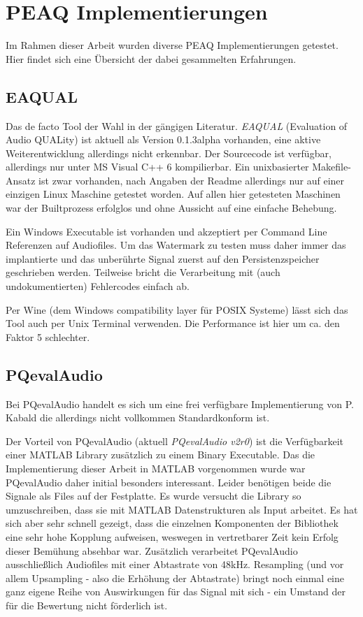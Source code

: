 \chapter{PEAQ Implementierungen}
\label{ch:peaq}

Im Rahmen dieser Arbeit wurden diverse PEAQ Implementierungen getestet. Hier findet sich eine Übersicht der dabei gesammelten Erfahrungen.

\section{EAQUAL}

Das de facto Tool der Wahl in der gängigen Literatur\cite{xiang2007robust}\cite{kraetzer2006transparency}. \textit{EAQUAL} (Evaluation of Audio QUALity) ist aktuell als Version 0.1.3alpha vorhanden, eine aktive Weiterentwicklung allerdings nicht erkennbar. Der Sourcecode ist verfügbar, allerdings nur unter MS Visual C++ 6 kompilierbar. Ein unixbasierter Makefile-Ansatz ist zwar vorhanden, nach Angaben der Readme allerdings nur auf einer einzigen Linux Maschine getestet worden. Auf allen hier getesteten Maschinen war der Builtprozess erfolglos und ohne Aussicht auf eine einfache Behebung. 

Ein Windows Executable ist vorhanden und akzeptiert per Command Line Referenzen auf Audiofiles. Um das Watermark zu testen muss daher immer das implantierte und das unberührte Signal zuerst auf den Persistenzspeicher geschrieben werden. Teilweise bricht die Verarbeitung mit (auch undokumentierten) Fehlercodes einfach ab.

Per Wine (dem Windows compatibility layer für POSIX Systeme) lässt sich das Tool auch per Unix Terminal verwenden. Die Performance ist hier um ca. den Faktor 5 schlechter.

\section{PQevalAudio}

Bei PQevalAudio handelt es sich um eine frei verfügbare Implementierung von P. Kabald\cite{kabal2002examination} die allerdings nicht vollkommen Standardkonform ist.

Der Vorteil von PQevalAudio (aktuell \textit{PQevalAudio v2r0}) ist die Verfügbarkeit einer MATLAB Library zusätzlich zu einem Binary Executable. Das die Implementierung dieser Arbeit in MATLAB vorgenommen wurde war PQevalAudio daher initial besonders interessant. Leider benötigen beide die Signale als Files auf der Festplatte. Es wurde versucht die Library so umzuschreiben, dass sie mit MATLAB Datenstrukturen als Input arbeitet. Es hat sich aber sehr schnell gezeigt, dass die einzelnen Komponenten der Bibliothek eine sehr hohe Kopplung aufweisen, weswegen in vertretbarer Zeit kein Erfolg dieser Bemühung absehbar war. Zusätzlich verarbeitet PQevalAudio ausschließlich Audiofiles mit einer Abtastrate von 48kHz. Resampling (und vor allem Upsampling - also die Erhöhung der Abtastrate) bringt noch einmal eine ganz eigene Reihe von Auswirkungen für das Signal mit sich - ein Umstand der für die Bewertung nicht förderlich ist.

